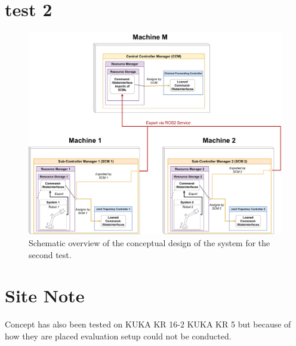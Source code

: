 \section{test 2}
\begin{figure}[htbp]
	\centering
	\includegraphics[width=1\textwidth]{Figures/c6/test_scenario_2.drawio.pdf}
	\caption{Schematic overview of the conceptual design of the system for the second test.}
	\label{c6_fig_test_scenario_2}
\end{figure}

\section*{Site Note}
Concept has also been tested on KUKA KR 16-2 KUKA KR 5 but because of how they are placed evaluation setup could not be conducted.

